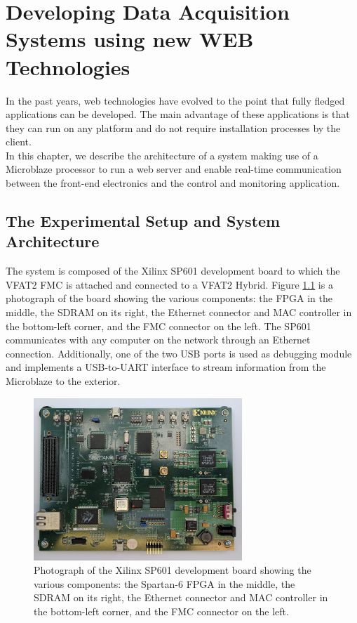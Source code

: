 \chapter{Developing Data Acquisition Systems using new WEB Technologies}
\label{chap:III-2-web-daq}

  In the past years, web technologies have evolved to the point that fully fledged applications can be developed. The main advantage of these applications is that they can run on any platform and do not require installation processes by the client. \\

  In this chapter, we describe the architecture of a system making use of a Microblaze processor to run a web server and enable real-time communication between the front-end electronics and the control and monitoring application.

  \section{The Experimental Setup and System Architecture}

    The system is composed of the Xilinx SP601 development board to which the VFAT2 FMC is attached and connected to a VFAT2 Hybrid. Figure \ref{fig:III-2-sp601} is a photograph of the board showing the various components: the FPGA in the middle, the SDRAM on its right, the Ethernet connector and MAC controller in the bottom-left corner, and the FMC connector on the left. The SP601 communicates with any computer on the network through an Ethernet connection. Additionally, one of the two USB ports is used as debugging module and implements a USB-to-UART interface to stream information from the Microblaze to the exterior. \\

    \begin{figure}[t!]
      \centering
      \includegraphics[width=0.7\textwidth]{img/III-2-web-daq/sp601.jpg}
      \caption{Photograph of the Xilinx SP601 development board showing the various components: the Spartan-6 FPGA in the middle, the SDRAM on its right, the Ethernet connector and MAC controller in the bottom-left corner, and the FMC connector on the left.}
      \label{fig:III-2-sp601}
    \end{figure}

